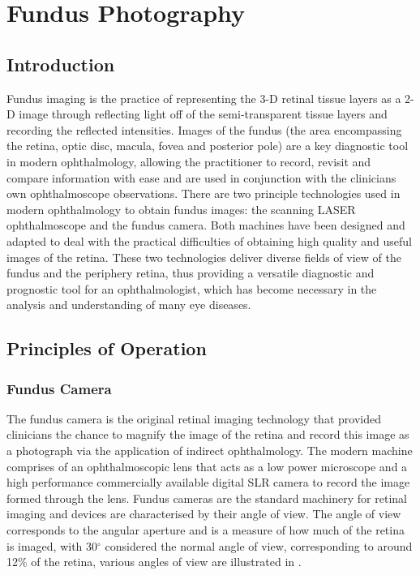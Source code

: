 
\chapter{Fundus Photography}
\label{fundus_photography}
\section{Introduction}

Fundus imaging is the practice of representing the 3-D retinal tissue layers as a 2-D image through reflecting light off of the semi-transparent tissue layers and recording the reflected intensities. Images of the fundus (the area encompassing the retina, optic disc, macula, fovea and posterior pole) are a key diagnostic tool in modern ophthalmology, allowing the practitioner to record, revisit and compare information with ease and are used in conjunction with the clinicians own ophthalmoscope observations. There are two principle technologies used in modern ophthalmology to obtain fundus images: the scanning LASER ophthalmoscope and the fundus camera. Both machines have been designed and adapted to deal with the practical difficulties of obtaining high quality and useful images of the retina. These two technologies deliver diverse fields of view of the fundus and the periphery retina, thus providing a versatile diagnostic and prognostic tool for an ophthalmologist, which has become necessary in the analysis and understanding of many eye diseases. 


\section{Principles of Operation}

\subsection{Fundus Camera}

The fundus camera is the original retinal imaging technology that provided clinicians the chance to magnify the image of the retina and record this image as a photograph via the application of indirect ophthalmology. The modern machine comprises of an ophthalmoscopic lens that acts as a low power microscope and a high performance commercially available digital SLR camera to record the image formed through the lens. Fundus cameras are the standard machinery for retinal imaging and devices are characterised by their angle of view. The angle of view corresponds to the angular aperture and is a measure of how much of the retina is imaged, with 30$^\circ$ considered the normal angle of view, corresponding to around 12\% of the retina, various angles of view are illustrated in .

